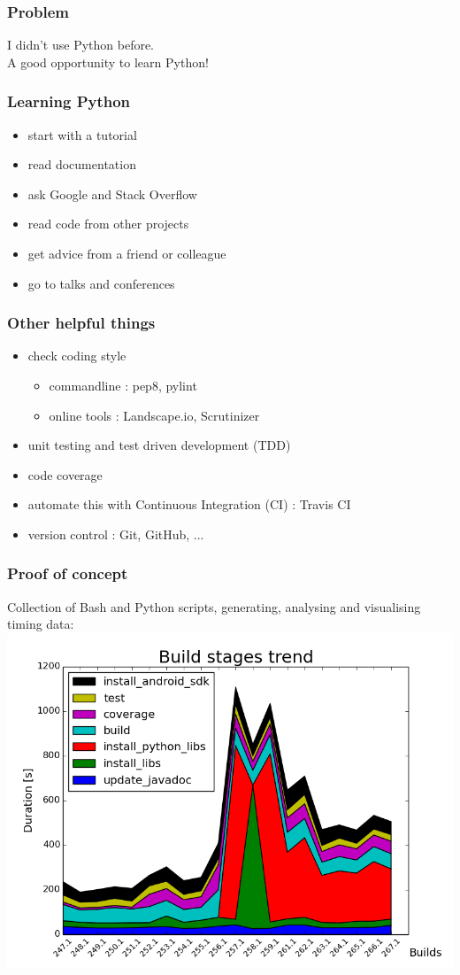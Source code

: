 \documentclass[14pt]{beamer}
\begin{document}
  \begin{frame}
    \frametitle{Problem}
    I didn't use Python before.\\
    \pause
    A good opportunity to learn Python!
  \end{frame}
  \begin{frame}
    \frametitle{Learning Python}
    \begin{itemize}
      \item start with a tutorial
      \item read documentation
      \item ask Google and Stack Overflow
      \item read code from other projects
      \item get advice from a friend or colleague
      \item go to talks and conferences
    \end{itemize}
  \end{frame}
  \begin{frame}
    \frametitle{Other helpful things}
    \begin{itemize}
      \item check coding style
        \begin{itemize}
          \item commandline : pep8, pylint
          \item online tools : Landscape.io, Scrutinizer
        \end{itemize}
      \item unit testing and test driven development (TDD)
      \item code coverage
      \item automate this with Continuous Integration (CI) : Travis CI
      \item version control : Git, GitHub, ...
    \end{itemize}
  \end{frame}
  \begin{frame}
    \frametitle{Proof of concept}
    Collection of Bash and Python scripts, generating, analysing and visualising timing data:
    \includegraphics[scale=.45]{example_matplotlib_trend.png}
  \end{frame}
\end{document}
